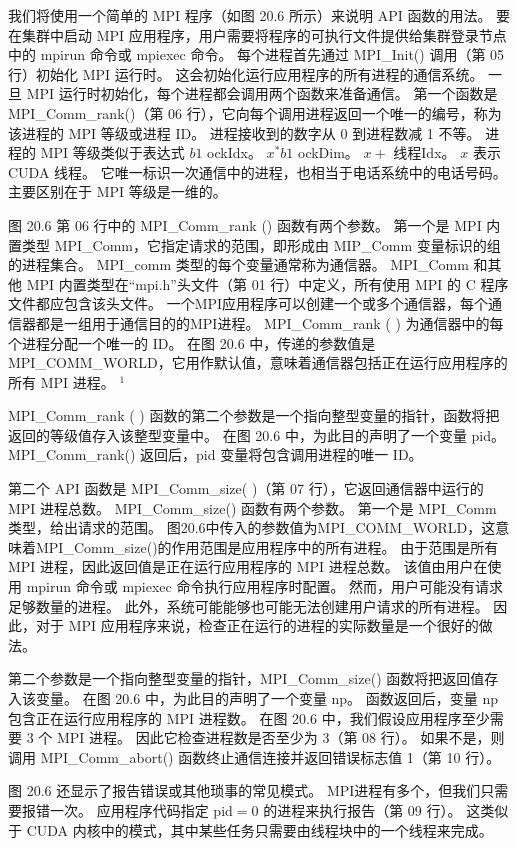 我们将使用一个简单的 MPI 程序（如图 20.6 所示）来说明 API 函数的用法。 要在集群中启动 MPI 应用程序，用户需要将程序的可执行文件提供给集群登录节点中的 mpirun 命令或 mpiexec 命令。 每个进程首先通过 MPI\_Init() 调用（第 05 行）初始化 MPI 运行时。 这会初始化运行应用程序的所有进程的通信系统。 一旦 MPI 运行时初始化，每个进程都会调用两个函数来准备通信。 第一个函数是 MPI\_Comm\_rank()（第 06 行），它向每个调用进程返回一个唯一的编号，称为该进程的 MPI 等级或进程 ID。 进程接收到的数字从 0 到进程数减 1 不等。 进程的 MPI 等级类似于表达式 $b 1$ ockIdx。 $x^{*} b 1$ ockDim。 $x+$ 线程Idx。 $x$ 表示 CUDA 线程。 它唯一标识一次通信中的进程，也相当于电话系统中的电话号码。 主要区别在于 MPI 等级是一维的。

图 20.6 第 06 行中的 MPI\_Comm\_rank () 函数有两个参数。 第一个是 MPI 内置类型 MPI\_Comm，它指定请求的范围，即形成由 MIP\_Comm 变量标识的组的进程集合。 MPI\_comm 类型的每个变量通常称为通信器。 MPI\_Comm 和其他 MPI 内置类型在“mpi.h”头文件（第 01 行）中定义，所有使用 MPI 的 C 程序文件都应包含该头文件。 一个MPI应用程序可以创建一个或多个通信器，每个通信器都是一组用于通信目的的MPI进程。 MPI\_Comm\_rank ( ) 为通信器中的每个进程分配一个唯一的 ID。 在图 20.6 中，传递的参数值是 MPI\_COMM\_WORLD，它用作默认值，意味着通信器包括正在运行应用程序的所有 MPI 进程。 ${ }^{1}$

MPI\_Comm\_rank ( ) 函数的第二个参数是一个指向整型变量的指针，函数将把返回的等级值存入该整型变量中。 在图 20.6 中，为此目的声明了一个变量 pid。 MPI\_Comm\_rank() 返回后，pid 变量将包含调用进程的唯一 ID。

第二个 API 函数是 MPI\_Comm\_size( )（第 07 行），它返回通信器中运行的 MPI 进程总数。 MPI\_Comm\_size() 函数有两个参数。 第一个是 MPI\_Comm 类型，给出请求的范围。 图20.6中传入的参数值为MPI\_COMM\_WORLD，这意味着MPI\_Comm\_size()的作用范围是应用程序中的所有进程。 由于范围是所有 MPI 进程，因此返回值是正在运行应用程序的 MPI 进程总数。 该值由用户在使用 mpirun 命令或 mpiexec 命令执行应用程序时配置。 然而，用户可能没有请求足够数量的进程。 此外，系统可能能够也可能无法创建用户请求的所有进程。 因此，对于 MPI 应用程序来说，检查正在运行的进程的实际数量是一个很好的做法。

第二个参数是一个指向整型变量的指针，MPI\_Comm\_size() 函数将把返回值存入该变量。 在图 20.6 中，为此目的声明了一个变量 np。 函数返回后，变量 np 包含正在运行应用程序的 MPI 进程数。 在图 20.6 中，我们假设应用程序至少需要 3 个 MPI 进程。 因此它检查进程数是否至少为 3（第 08 行）。 如果不是，则调用 MPI\_Comm\_abort() 函数终止通信连接并返回错误标志值 1（第 10 行）。

图 20.6 还显示了报告错误或其他琐事的常见模式。 MPI进程有多个，但我们只需要报错一次。 应用程序代码指定 $\mathrm{pid}=0$ 的进程来执行报告（第 09 行）。 这类似于 CUDA 内核中的模式，其中某些任务只需要由线程块中的一个线程来完成。

